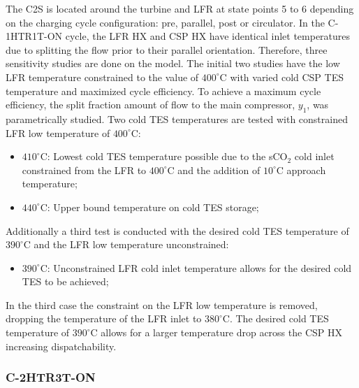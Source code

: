 \begin{paracol}{2}
\linenumbers
\switchcolumn

The C2S is located around the turbine and LFR at state points 5 to 6 depending on the charging cycle configuration: pre, parallel, post or circulator. In the C-1HTR1T-ON cycle, the LFR HX and CSP HX have identical inlet temperatures due to splitting the flow prior to their parallel orientation. Therefore, three sensitivity studies are done on the model. The initial two studies have the low LFR temperature constrained to the value of $400^{\circ}$C with varied cold CSP TES temperature and maximized cycle efficiency. To achieve a maximum cycle efficiency, the split fraction amount of flow to the main compressor, $y_{1}$, was parametrically studied.
Two cold TES temperatures are tested with constrained LFR low temperature of $400^{\circ}$C: 
\begin{itemize}
    \item	$410^{\circ}$C: Lowest cold TES temperature possible due to the sCO$_2$ cold inlet constrained from the LFR to $400^{\circ}$C and the addition of $10^{\circ}$C approach temperature;
    \item	$440^{\circ}$C: Upper bound temperature on cold TES storage;
\end{itemize}

Additionally a third test is conducted with the desired cold TES temperature of $390^{\circ}$C and the LFR low temperature unconstrained:

\begin{itemize}
    \item	$390^{\circ}$C: Unconstrained LFR cold inlet temperature allows for the desired cold TES to be achieved;
\end{itemize}

In the third case the constraint on the LFR low temperature is removed, dropping the temperature of the LFR inlet to $380^{\circ}$C. The desired cold TES temperature of $390^{\circ}$C allows for a larger temperature drop across the CSP HX increasing dispatchability.


\subsubsection{C-2HTR3T-ON} 


\end{paracol}
